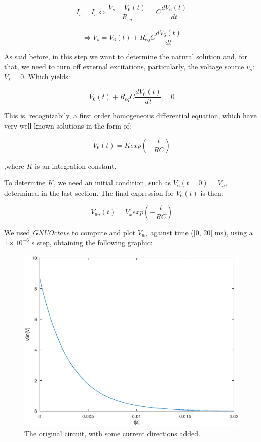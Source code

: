 \begin{center}
  \begin{equation}
    I_c = I_c \Leftrightarrow \frac{V_s-V_6(t)}{R_{eq}} = C\frac{dV_6(t)}{dt}
  \end{equation} 
\end{center}


\begin{center}
  \begin{equation}
    \Leftrightarrow V_s = V_6(t) + R_{eq}C\frac{dV_6(t)}{dt}
  \end{equation} 
\end{center}


As said before, in this step we want to determine the natural solution and, for that, we need to turn off external excitations, particularly, the voltage source $v_s$: $V_s = 0$. Which yields:

\begin{center}
  \begin{equation}
    V_6(t) + R_{eq}C\frac{dV_6(t)}{dt} = 0
  \end{equation} 
\end{center}



This is, recognizabily, a first order homogeneous differential equation, which have very well known solutions in the form of:

\begin{center}
  \begin{equation}
    V_6(t) = K exp(-\frac{t}{RC})
  \end{equation} 
\end{center}


,where $K$ is an integration constant.

To determine $K$, we need an initial condition, such as $V_6(t=0) = V_x$, determined in the last section. The final expression for $V_6(t)$ is then:

\begin{center}
  \begin{equation}
    V_{6n}(t) = V_x exp(-\frac{t}{RC})
  \end{equation} 
\end{center}



We used \textit{GNUOctave} to compute and plot $V_{6n}$ against time ([0, 20] ms), using a $1\times10^{-6}$ s step, obtaining the following graphic:


\begin{figure}[h] \centering
\includegraphics[width=0.4\linewidth]{t2-t3.eps}
\caption{The original circuit, with some current directions added.}
\label{cfergter}
\end{figure}


